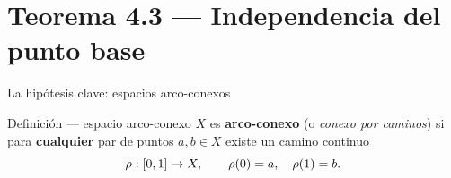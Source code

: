 \section{Teorema 4.3 — Independencia del punto base}

\begin{frame}{La hipótesis clave: espacios arco-conexos}

  \begin{block}{Definición — espacio arco-conexo}
    $X$ es \textbf{arco-conexo} (o \emph{conexo por caminos}) si para
    \textbf{cualquier} par de puntos $a, b \in X$ existe un camino continuo
    \[
      \rho : [0,1] \to X, \qquad \rho(0) = a, \quad \rho(1) = b.
    \]
  \end{block}


\end{frame}
